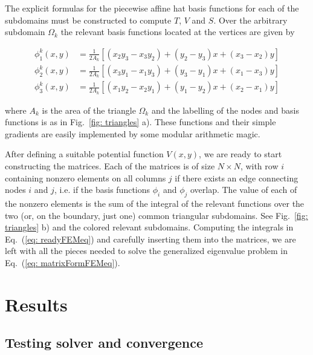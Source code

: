 \documentclass[a4paper,12pt]{article}
\begin{document}
The explicit formulas for the piecewise affine hat basis functions for each of the subdomains must be constructed to compute $T$, $V$ and $S$. Over the arbitrary subdomain $\Omega_k$ the relevant basis functions located at the vertices are given by

\begin{eqnarray}
\phi_1^k(x,y) &= \frac{1}{2A_k} \left[ (x_2y_3 - x_3y_2) + (y_2 - y_3)x + (x_3-x_2)y \right] \\
\phi_2^k(x,y) &= \frac{1}{2A_k} \left[ (x_3y_1 - x_1y_3) + (y_3 - y_1)x + (x_1-x_3)y  \right] \\
\phi_3^k(x,y) &= \frac{1}{2A_k} \left[ (x_1y_2 - x_2y_1) + (y_1 - y_2)x + (x_2-x_1)y \right]
\end{eqnarray}

where $A_k$ is the area of the triangle $\Omega_k$ and the labelling of the nodes and basis functions is as in Fig.~\ref{fig: triangles} a). These functions and their simple gradients are easily implemented by some modular arithmetic magic.

After defining a suitable potential function $V(x,y)$, we are ready to start constructing the matrices. Each of the matrices is of size $N \times N$, with row $i$ containing nonzero elements on all columns $j$ if there exists an edge connecting nodes $i$ and $j$, i.e. if the basis functions $\phi_i$ and $\phi_j$ overlap. The value of each of the nonzero elements is the sum of the integral of the relevant functions over the two (or, on the boundary, just one) common triangular subdomains. See Fig.~\ref{fig: triangles} b) and the colored relevant subdomains. Computing the integrals in Eq.~(\ref{eq: readyFEMeq}) and carefully inserting them into the matrices, we are left with all the pieces needed to solve the generalized eigenvalue problem in Eq.~(\ref{eq: matrixFormFEMeq}).

\cleardoublepage

\section{Results}

\subsection{Testing solver and convergence}
\end{document}

